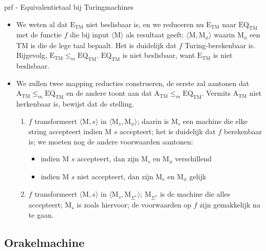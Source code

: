 \begin{prf}{prf - Equivalentietaal bij Turingmachines}
    \begin{itemize}
        \item 
            We weten al dat $\text{E}_{\text{TM}}$ niet beslisbaar is, en we reduceren nu $\text{E}_{\text{TM}}$ naar $\text{EQ}_{\text{TM}}$ met de functie $f$ die bij input $\langle \text{M} \rangle$ als resultaat geeft: $\langle \text{M}, \text{M}_{\phi} \rangle$ waarin $ \text{M}_{\phi}$ een TM is die de lege taal bepaalt. Het is duidelijk dat $f$ Turing-berekenbaar is. Bijgevolg, $\text{E}_{\text{TM}} \leq_m \text{EQ}_{\text{TM}}$. $\text{EQ}_{\text{TM}}$ is niet beslisbaar, want $\text{E}_{\text{TM}}$ is niet beslisbaar.
        \item  
            We zullen twee mapping reducties construeren, de eerste zal aantonen dat $\text{A}_{\text{TM}} \leq_m \overline{\text{EQ}_{\text{TM}}}$ en de andere toont aan dat $\text{A}_{\text{TM}} \leq_m \text{EQ}_{\text{TM}}$. Vermits $\overline{\text{A}_{\text{TM}}}$ niet herkenbaar is, bewijst dat de stelling.
            \begin{enumerate}
                \item $f$ transformeert $\langle \text{M}, s \rangle$ in $\langle \text{M}_s, \text{M}_\phi \rangle$; daarin is $\text{M}_s$ een machine die elke string accepteert indien M $s$ accepteert; het is duidelijk dat $f$ berekenbaar is; we moeten nog de andere voorwaarden aantonen:
                \begin{itemize}
                    \item indien M $s$ accepteert, dan zijn M$_s$ en M$_\phi$ verschillend
                    \item indien M $s$ niet accepteert, dan zijn M$_s$ en M$_\phi$ gelijk
                \end{itemize}
                \item $f$ transformeert $\langle \text{M}, s \rangle$ in $\langle \text{M}_s, \text{M}_{\Sigma^*} \rangle$; $\text{M}_{\Sigma^*}$ is de machine die alles accepteert; M$_s$ is zoals hiervoor; de voorwaarden op $f$ zijn gemakkelijk na te gaan. 
            \end{enumerate}
    \end{itemize}
\end{prf}

\subsection{Orakelmachine}

